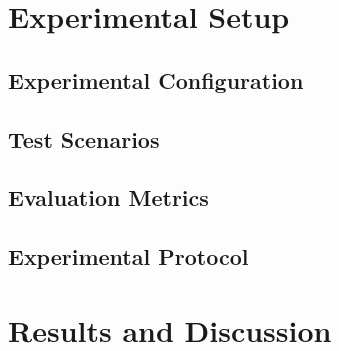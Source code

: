 \documentclass[conference]{IEEEtran}
\begin{document}
\section{Experimental Setup}
\label{sec:experiments}
\subsection{Experimental Configuration}
\subsection{Test Scenarios}
\subsection{Evaluation Metrics}
\subsection{Experimental Protocol}



\section{Results and Discussion}
\label{sec:results}

\end{document}
